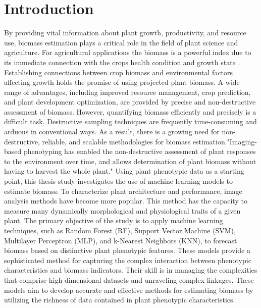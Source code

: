 \documentclass[a4paper,12pt]{report}%
\renewcommand{\\}{\vspace*{0.5\baselineskip} \newline}
\begin{document}
\tableofcontents
\newpage
{}



\chapter{Introduction}
By providing vital information about plant growth, productivity, and resource use, biomass estimation plays a critical role in the field of plant science and agriculture. For agricultural applications the biomass is a powerful index due to its immediate connection with the crops health condition and growth state \cite{1}. Establishing connections between crop biomass and environmental factors affecting growth holds the promise of using projected plant biomass. A wide range of advantages, including improved resource management, crop prediction, and plant development optimization, are provided by precise and non-destructive assessment of biomass. However, quantifying biomass efficiently and precisely is a difficult task. Destructive sampling techniques are frequently time-consuming and arduous in conventional ways. As a result, there is a growing need for non-destructive, reliable, and scalable methodologies for biomass estimation."Imaging-based phenotyping has enabled the non-destructive assessment of plant responses to the environment over time, and allows determination of plant biomass without having to harvest the whole plant."\cite{3}
Using plant phenotypic data as a starting point, this thesis study investigates the use of machine learning models to estimate biomass. To characterize plant architecture and performance, image analysis methods have become more popular. This method has the capacity to measure many dynamically morphological and physiological traits of a given plant.\cite{2} The primary objective of the study is to apply machine learning techniques, such as Random Forest (RF), Support Vector Machine (SVM), Multilayer Perceptron (MLP), and k-Nearest Neighbors (KNN), to forecast biomass based on distinctive plant phenotypic features. These models provide a sophisticated method for capturing the complex interaction between phenotypic characteristics and biomass indicators. Their skill is in managing the complexities that comprise high-dimensional datasets and unraveling complex linkages. These models aim to develop accurate and effective methods for estimating biomass by utilizing the richness of data contained in plant phenotypic characteristics.
\end{document}
